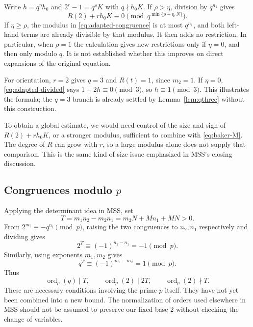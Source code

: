 \documentclass[11pt]{article}
\begin{document}
Write $h=q^\eta h_0$ and $2^r-1=q^\rho K$ with $q\nmid h_0K$.
If $\rho>\eta$, division by $q^{n_1}$ gives
\begin{equation}\label{eq:adapted-divided}
\boxed{R(2)+r h_0K\equiv0\pmod{q^{\min\{\rho-\eta,N\}}}.}
\end{equation}
If $\eta\geq\rho$, the modulus in
\eqref{eq:adapted-congruence} is at most $q^{n_1}$, and both left-hand
terms are already divisible by that modulus. It then adds no restriction.
In particular, when $\rho=1$ the calculation gives new restrictions
only if $\eta=0$, and then only modulo $q$.
It is not established whether this improves on direct expansions of the
original equation.

For orientation, $r=2$ gives $q=3$ and $R(t)=1$, since $m_2=1$.
If $\eta=0$, \eqref{eq:adapted-divided} says $1+2h\equiv0\pmod3$,
so $h\equiv1\pmod3$. This illustrates the formula; the $q=3$ branch is already settled by
Lemma~\ref{lem:qthree} without this construction.

To obtain a global estimate, we would need control of the size and sign of $R(2)+r h_0K$, or a
stronger modulus, sufficient to combine with \eqref{eq:baker-M}.
The degree of $R$ can grow with $r$, so a large modulus alone does not
supply that comparison. This is the same kind of size issue emphasized
in MSS's closing discussion.

\subsection{\texorpdfstring{Congruences modulo $p$}{Congruences modulo p}}

Applying the determinant idea in MSS, set
\[
T=m_1n_2-m_2n_1=m_2N+Mn_1+MN>0.
\]
From $2^{m_i}\equiv-q^{n_i}\pmod p$, raising the two congruences
to $n_2,n_1$ respectively and dividing gives
\[
2^T\equiv(-1)^{n_2-n_1}=-1\pmod p.
\]
Similarly, using exponents $m_1,m_2$ gives
\[
q^T\equiv(-1)^{m_1-m_2}=1\pmod p.
\]
Thus
\[
\operatorname{ord}_p(q)\mid T,\qquad
\operatorname{ord}_p(2)\mid2T,\qquad
\operatorname{ord}_p(2)\nmid T.
\]
These are necessary conditions involving the prime $p$ itself.
They have not yet been combined into a new bound.
The normalization of orders used elsewhere in MSS should not be assumed
to preserve our fixed base $2$ without checking the change of variables.

{}


\end{document}
